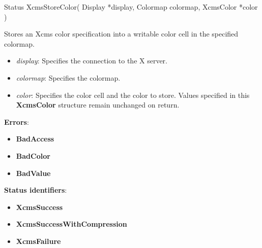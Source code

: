 \documentclass{report}
\begin{document}
\begin{itemize}
            \begin{cppcode}
                Status XcmsStoreColor(
                    Display *display,
                    Colormap colormap,
                    XcmsColor *color
                )
            \end{cppcode}
            \bigbreak \noindent
            Stores an Xcms color specification into a writable color cell in the specified colormap.
            \begin{itemize}
                \item \textit{display}: Specifies the connection to the X server.
                \item \textit{colormap}: Specifies the colormap.
                \item \textit{color}: Specifies the color cell and the color to store. Values specified in this \textbf{XcmsColor} structure remain unchanged on return.
            \end{itemize}
            \bigbreak \noindent
            \textbf{Errors}:
            \begin{itemize}
                \item \textbf{BadAccess}
                \item \textbf{BadColor}
                \item \textbf{BadValue}
            \end{itemize}
            \bigbreak \noindent
            \textbf{Status identifiers}:
            \begin{itemize}
                \item \textbf{XcmsSuccess}
                \item \textbf{XcmsSuccessWithCompression}
                \item \textbf{XcmsFailure}
            \end{itemize}


\end{itemize}
\end{document}
